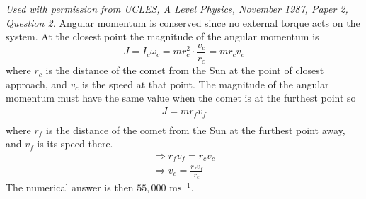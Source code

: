 
\begin{problem} 
{ 
}
{\textit{Used with permission from UCLES, A Level Physics, November 1987, Paper 2, Question 2.}}
{
Angular momentum is conserved since no external torque acts on the system. At the closest point the magnitude of the angular momentum is 
\begin{equation*}
J=I_c\omega_c=mr_c^2\cdot \frac{v_c}{r_c}=mr_cv_c
\end{equation*}
where $r_c$ is the distance of the comet from the Sun at the point of closest approach, and $v_c$ is the speed at that point. The magnitude of the angular momentum must have the same value when the comet is at the furthest point so 
\begin{align*}
J=mr_fv_f \\
\end{align*}
where $r_f$ is the distance of the comet from the Sun at the furthest point away, and $v_f$ is its speed there. 
\begin{align*}
\Rightarrow r_fv_f=r_cv_c \\
\Rightarrow v_c=\frac{r_f v_f}{r_c}
\end{align*}
The numerical answer is then $55,000\textrm{ ms}^{-1}$.
}
\end{problem}